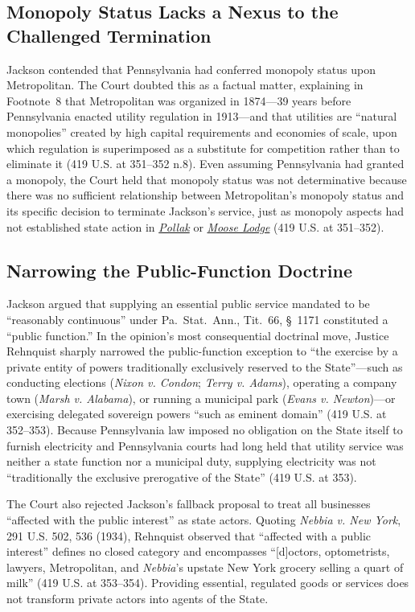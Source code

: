 \documentclass[12pt]{article}
\begin{document}
\subsection{Monopoly Status Lacks a Nexus to the Challenged Termination}
Jackson contended that Pennsylvania had conferred monopoly status upon Metropolitan. The Court doubted this as a factual matter, explaining in Footnote~8 that Metropolitan was organized in 1874---39 years before Pennsylvania enacted utility regulation in 1913---and that utilities are ``natural monopolies'' created by high capital requirements and economies of scale, upon which regulation is superimposed as a substitute for competition rather than to eliminate it (419 U.S. at 351--352 n.8). Even assuming Pennsylvania had granted a monopoly, the Court held that monopoly status was not determinative because there was no sufficient relationship between Metropolitan's monopoly status and its specific decision to terminate Jackson's service, just as monopoly aspects had not established state action in \href{https://supreme.justia.com/cases/federal/us/343/451/}{\emph{Pollak}} or \href{https://supreme.justia.com/cases/federal/us/407/163/}{\emph{Moose Lodge}} (419 U.S. at 351--352).

\subsection{Narrowing the Public-Function Doctrine}
Jackson argued that supplying an essential public service mandated to be ``reasonably continuous'' under Pa.\ Stat.\ Ann., Tit.~66, \S~1171 constituted a ``public function.'' In the opinion's most consequential doctrinal move, Justice Rehnquist sharply narrowed the public-function exception to ``the exercise by a private entity of powers traditionally exclusively reserved to the State''---such as conducting elections (\emph{Nixon v. Condon}; \emph{Terry v. Adams}), operating a company town (\emph{Marsh v. Alabama}), or running a municipal park (\emph{Evans v. Newton})---or exercising delegated sovereign powers ``such as eminent domain'' (419 U.S. at 352--353). Because Pennsylvania law imposed no obligation on the State itself to furnish electricity and Pennsylvania courts had long held that utility service was neither a state function nor a municipal duty, supplying electricity was not ``traditionally the exclusive prerogative of the State'' (419 U.S. at 353).

The Court also rejected Jackson's fallback proposal to treat all businesses ``affected with the public interest'' as state actors. Quoting \emph{Nebbia v. New York}, 291 U.S. 502, 536 (1934), Rehnquist observed that ``affected with a public interest'' defines no closed category and encompasses ``[d]octors, optometrists, lawyers, Metropolitan, and \emph{Nebbia}'s upstate New York grocery selling a quart of milk'' (419 U.S. at 353--354). Providing essential, regulated goods or services does not transform private actors into agents of the State.
\end{document}

